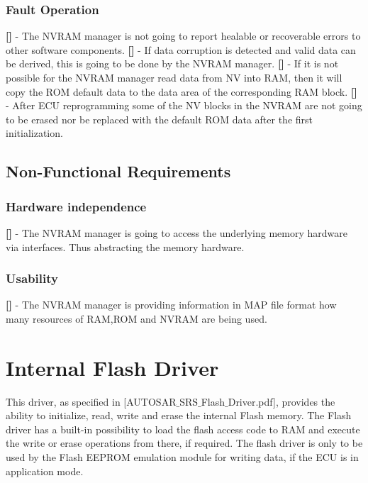 \subsubsection{Fault Operation}
{\bf []} - The \mbox{NVRAM} manager is not going to report healable or recoverable errors to other software components.\newline
\newline
{\bf []} - If data corruption is detected and valid data can be derived, this is going to be done by the \mbox{NVRAM} manager.\newline
\newline
{\bf []} - If it is not possible for the \mbox{NVRAM} manager read data from \mbox{NV} into \mbox{RAM}, then it will copy the \mbox{ROM} default data to the data area of the corresponding \mbox{RAM} block.\newline
\newline
{\bf []} - After \mbox{ECU} reprogramming some of the \mbox{NV} blocks in the \mbox{NVRAM} are not going to be erased nor be replaced with the default \mbox{ROM} data after the first initialization.\newline
\subsection{Non-Functional Requirements}
\subsubsection{Hardware independence}
{\bf []} - The \mbox{NVRAM} manager is going to access the underlying memory hardware via interfaces. Thus abstracting the memory hardware.

\subsubsection{Usability}
{\bf []} - The \mbox{NVRAM} manager is providing information in \mbox{MAP} file format how many resources of \mbox{RAM},\mbox{ROM} and \mbox{NVRAM} are being used.
\newpage

\section{Internal Flash Driver}
This driver, as specified in  [AUTOSAR$\_$SRS$\_$Flash$\_$Driver.pdf], provides the ability to initialize, read, write and erase the internal Flash memory. The Flash driver has a built-in possibility to load the flash access code to \mbox{RAM} and execute the write or erase operations from there, if required.\newline
The flash driver is only to be used by the Flash \mbox{EEPROM} emulation module for writing data, if the ECU is in application mode.

